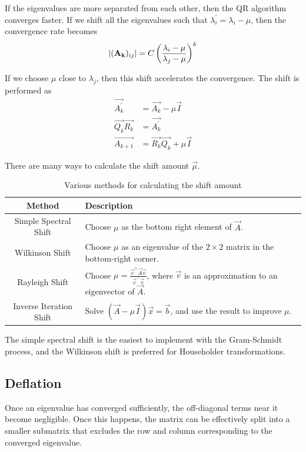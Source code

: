 \documentclass{article}
\begin{document}
If the eigenvalues are more separated from each other, then the QR algorithm converges
faster. 
If we shift all the eigenvalues such that $\lambda_i^\prime = \lambda_i - \mu$,
then the convergence rate becomes
\begin{align}
    \left\vert(\mathbf{A_k})_{ij}\right\vert = C \left(\frac{\lambda_i - \mu}{\lambda_j - \mu}\right)^k
\end{align}

If we choose $\mu$ close to $\lambda_j$, then this shift accelerates the convergence.
The shift is performed as
\begin{align}
    \vec{A_k^\prime} &= \vec{A_k} - \mu\vec{I} \\
    \vec{Q_k}\vec{R_k} &= \vec{A_k^\prime} \\
    \vec{A_{k+1}} &= \vec{R_k}\vec{Q_k} + \mu\vec{I}
\end{align}

There are many ways to calculate the shift amount $\vec{\mu}$.

\begin{table}[h!]
\centering
\begin{tabular}{|c|p{5cm}|}    
    \hline
    \textbf{Method} & \textbf{Description} \\
    \hline
    Simple Spectral Shift & Choose $\mu$ as the bottom right element of $\vec{A}$. \\
    \hline
    Wilkinson Shift & Choose $\mu$ as an eigenvalue of the $2 \times 2$ matrix in the bottom-right corner. \\
    \hline
    Rayleigh Shift & Choose $\mu = \frac{\vec{v}^\top\vec{A}\vec{v}}{\vec{v}^\top\vec{v}}$, where $\vec{v}$ is an approximation to an eigenvector of $\vec{A}$. \\
    \hline
    Inverse Iteration Shift & Solve $(\vec{A} - \mu\vec{I})\vec{x} = \vec{b}$, and use the result to improve $\mu$. \\
    \hline
\end{tabular}
\caption{Various methods for calculating the shift amount}
\end{table}

The simple spectral shift is the easiest to implement with the Gram-Schmidt process,
and the Wilkinson shift is preferred for Householder transformations.

\subsection{Deflation}

Once an eigenvalue has converged sufficiently, the off-diagonal terms near it become negligible.
Once this happens, the matrix can be effectively split into a smaller submatrix that excludes
the row and column corresponding to the converged eigenvalue.
\end{document}
